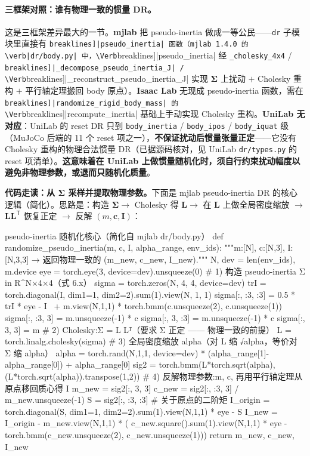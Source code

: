 \paragraph{三框架对照：谁有物理一致的惯量 DR。}这是三框架差异最大的一节。\textbf{mjlab} 把 pseudo-inertia 做成一等公民——\verb|dr| 子模块里直接有 \Verb[breaklines]|pseudo_inertia| 函数（mjlab 1.4.0 的 \verb|dr/body.py| 中，\Verb[breaklines]|pseudo_inertia| 经 \verb|_cholesky_4x4| / \Verb[breaklines]|_decompose_pseudo_inertia_J| / \Verb[breaklines]|_reconstruct_pseudo_inertia_J| 实现 $\boldsymbol\Sigma$ 上扰动 $+$ Cholesky 重构 $+$ 平行轴定理搬回 body 原点）。\textbf{Isaac Lab} 无现成 pseudo-inertia 函数，需在 \Verb[breaklines]|randomize_rigid_body_mass| 的 \Verb[breaklines]|recompute_inertia| 基础上手动实现 Cholesky 重构。\textbf{UniLab 无对应}：UniLab 的 reset DR 只到 \verb|body_inertia| / \verb|body_ipos| / \verb|body_iquat| 级（MuJoCo 后端的 11 个 reset 项之一），\textbf{不保证扰动后惯量张量正定}——它没有 Cholesky 重构的物理合法惯量 DR（已据源码核对，见 UniLab \verb|dr/types.py| 的 reset 项清单）。\textbf{这意味着在 UniLab 上做惯量随机化时，须自行约束扰动幅度以避免非物理参数，或退而只随机化质量}。

\textbf{代码走读：从 $\boldsymbol\Sigma$ 采样并提取物理参数。}下面是 mjlab pseudo-inertia DR 的核心逻辑（简化）。思路是：构造 $\boldsymbol\Sigma\to$ Cholesky 得 $\mathbf L\to$ 在 $\mathbf L$ 上做全局密度缩放 $\to$ $\mathbf L\mathbf L^{\mathsf T}$ 恢复正定 $\to$ 反解 $(m,\mathbf c,\mathbf I)$：

\begin{codebox}[Python]{pseudo-inertia 随机化核心（简化自 mjlab dr/body.py）}
def randomize_pseudo_inertia(m, c, I, alpha_range, env_ids):
    """m:[N], c:[N,3], I:[N,3,3] → 返回物理一致的 (m_new, c_new, I_new)."""
    N, dev = len(env_ids), m.device
    eye = torch.eye(3, device=dev).unsqueeze(0)
    # 1) 构造 pseudo-inertia Σ  in  R^{N×4×4}（式 6.x）
    sigma = torch.zeros(N, 4, 4, device=dev)
    trI = torch.diagonal(I, dim1=1, dim2=2).sum(1).view(N, 1, 1)
    sigma[:, :3, :3] = 0.5 * trI * eye - I \
                       + m.view(N,1,1) * torch.bmm(c.unsqueeze(2), c.unsqueeze(1))
    sigma[:, :3, 3] = m.unsqueeze(-1) * c
    sigma[:, 3, :3] = m.unsqueeze(-1) * c
    sigma[:, 3, 3]  = m
    # 2) Cholesky:Σ = L Lᵀ（要求 Σ 正定 —— 物理一致的前提）
    L = torch.linalg.cholesky(sigma)
    # 3) 全局密度缩放 alpha（对 L 缩 √alpha，等价对 Σ 缩 alpha）
    alpha = torch.rand(N,1,1, device=dev) * (alpha_range[1]-alpha_range[0]) + alpha_range[0]
    sig2 = torch.bmm(L*torch.sqrt(alpha), (L*torch.sqrt(alpha)).transpose(1,2))
    # 4) 反解物理参数:m, c, 再用平行轴定理从原点移回质心得 I
    m_new = sig2[:, 3, 3]
    c_new = sig2[:, :3, 3] / m_new.unsqueeze(-1)
    S = sig2[:, :3, :3]                                  # 关于原点的二阶矩
    I_origin = torch.diagonal(S, dim1=1, dim2=2).sum(1).view(N,1,1) * eye - S
    I_new = I_origin - m_new.view(N,1,1) * (
        c_new.square().sum(1).view(N,1,1) * eye
        - torch.bmm(c_new.unsqueeze(2), c_new.unsqueeze(1)))
    return m_new, c_new, I_new
\end{codebox}

